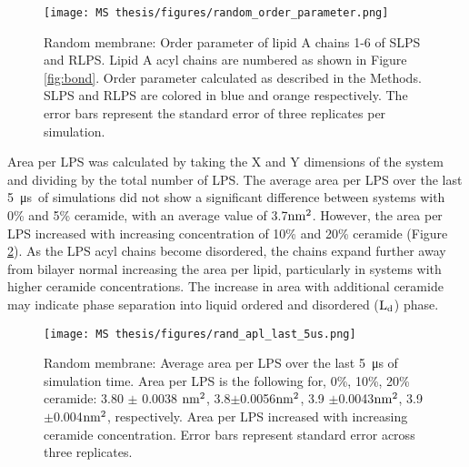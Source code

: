 \documentclass[10pt, letterpaper]{article}
\begin{document}
\begin{figure}[H]
  \centerline{\texttt{[image: MS thesis/figures/random\_order\_parameter.png]}}
  \caption[Random Membrane: Order Parameter]{Random membrane: Order parameter of lipid A chains 1-6 of SLPS and RLPS. Lipid A acyl chains are numbered as shown in Figure \ref{fig:bond}. Order parameter calculated as described in the Methods. SLPS and RLPS are colored in blue and orange respectively. The error bars represent the standard error of three replicates per simulation. }
  \label{fig:ran_order}
\end{figure}

Area per LPS was calculated by taking the X and Y dimensions of the system and dividing by the total number of LPS. 
The average area per LPS over the last \SI{5}{\micro\second}~of simulations did not show a significant difference between systems with 0\% and 5\% ceramide, with an average value of 3.7$\rm nm^2$. However, the area per LPS increased with increasing concentration of 10\% and 20\% ceramide (Figure \ref{fig:rand_apl}). 
As the LPS acyl chains become disordered, the chains expand further away from bilayer normal increasing the area per lipid, particularly in systems with higher ceramide concentrations. The increase in area with additional ceramide may indicate phase separation into liquid ordered and disordered ($\rm L_d$) phase.

\begin{figure}[H]
  \centerline{\texttt{[image: MS thesis/figures/rand\_apl\_last\_5us.png]}}
  \caption[Random Membrane: Area per LPS]{Random membrane: Average area per LPS over the last \SI{5}{\micro\second} of simulation time. Area per LPS is the following for, 0\%, 10\%, 20\% ceramide:  3.80 $\pm$ 0.0038 $\rm nm^2$, 3.8$\pm$0.0056$\rm nm^2$, 3.9 $\pm$0.0043$\rm nm^2$, 3.9$\pm$0.004$\rm nm^2$, respectively. Area per LPS increased with increasing ceramide concentration. Error bars represent standard error across three replicates. }
  \label{fig:rand_apl}
\end{figure}
\end{document}
